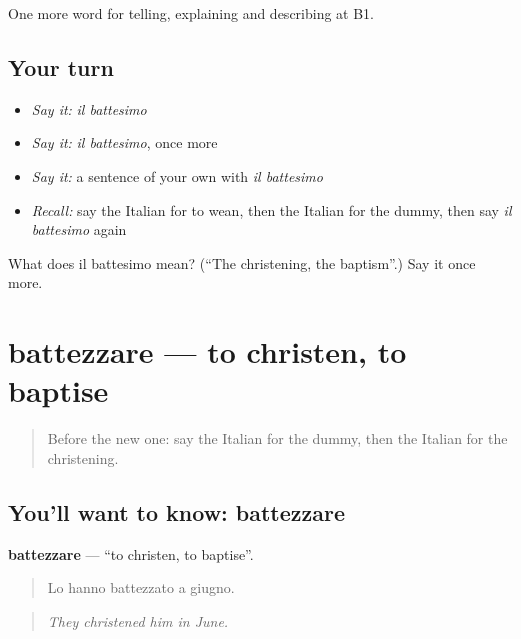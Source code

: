 \begin{grammarlens}[title={What you've built}]
One more word for telling, explaining and describing at B1.
\end{grammarlens}

\subsection*{Your turn}
\begin{itemize}
\raggedright
  \item \emph{Say it:} \emph{il battesimo}
  \item \emph{Say it:} \emph{il battesimo}, once more
  \item \emph{Say it:} a sentence of your own with \emph{il battesimo}
  \item \emph{Recall:} say the Italian for to wean, then the Italian for the dummy, then say \emph{il battesimo} again
\end{itemize}

\begin{tcolorbox}[breakable,colback=teal!4,colframe=teal!35!black,title={Before you move on}]
What does il battesimo mean? (\textquotedblleft{}The christening, the baptism\textquotedblright{}.) Say it once more.
\end{tcolorbox}
\section[battezzare]{battezzare — to christen, to baptise}

\label{lesson:IT-C308-battezzare}



\begin{quote}
Before the new one: say the Italian for the dummy, then the Italian for the christening.
\end{quote}

\subsection*{You'll want to know: battezzare}
\textbf{battezzare} — \textquotedblleft{}to christen, to baptise\textquotedblright{}.

\begin{quote}
Lo hanno battezzato a giugno.
\end{quote}

\begin{quote}
\emph{They christened him in June.}
\end{quote}

